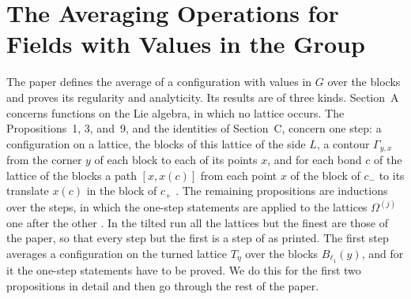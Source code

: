 \documentclass[11pt]{preprint}
\numberwithin{equation}{section}
\theoremstyle{definition}
\theoremstyle{remark}
\theoremstyle{plain}
\begin{document}
\section{The Averaging Operations for Fields with Values in the Group}\label{sec:averaging}

The paper \cite{BalabanAVG} defines the average of a configuration with values in $G$ over the blocks and proves its regularity and analyticity. Its results are of three kinds. Section~A concerns functions on the Lie algebra, in which no lattice occurs. The Propositions~1, 3, and~9, and the identities of Section~C, concern one step: a configuration on a lattice, the blocks of this lattice of the side $L$, a contour $\Gamma_{y,x}$ from the corner $y$ of each block to each of its points $x$, and for each bond $c$ of the lattice of the blocks a path $[x, x(c)]$ from each point $x$ of the block of $c_-$ to its translate $x(c)$ in the block of $c_+$ \cite[(14), (15), p.~19]{BalabanAVG}. The remaining propositions are inductions over the steps, in which the one-step statements are applied to the lattices $\Omega^{(j)}$ one after the other \cite[(43), (53), (127)]{BalabanAVG}. In the tilted run all the lattices but the finest are those of the paper, so that every step but the first is a step of \cite{BalabanAVG} as printed. The first step averages a configuration on the turned lattice $T_\eta$ over the blocks $B_{\ell_1}(y)$, and for it the one-step statements have to be proved. We do this for the first two propositions in detail and then go through the rest of the paper.
\end{document}
